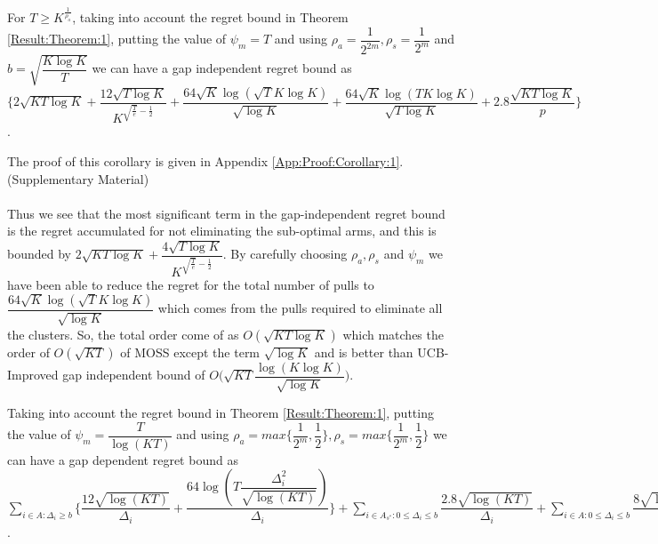 \begin{corollary}
\label{Result:Corollary:1}
For $T\geq K^{\frac{1}{\rho_{a}}}$, taking into account the regret bound in Theorem \ref{Result:Theorem:1}, putting the value of $\psi_{m}=T$ and using $\rho_{a}=\dfrac{1}{2^{2m}},\rho_{s}=\dfrac{1}{2^{m}} $ and $b=\sqrt{\dfrac{K\log K}{T}}$ we can have a gap independent regret bound as $\bigg\lbrace 2\sqrt{KT\log K} + \dfrac{12\sqrt{T\log K}}{K^{\sqrt{\frac{T}{e}}-\frac{1}{2}}} + \dfrac{64\sqrt{K}\log{(\sqrt{T}K\log K)}}{\sqrt{\log K}} + \dfrac{64\sqrt{K}\log{(TK\log K)}}{\sqrt{T\log K}} + 2.8\dfrac{\sqrt{KT\log K}}{p} \bigg\rbrace$.
\end{corollary}


	The proof of this corollary is given in Appendix \ref{App:Proof:Corollary:1}.(Supplementary Material)

\paragraph*{}Thus we see that the most significant term in the gap-independent regret bound is the regret accumulated for not eliminating the sub-optimal arms, and this is bounded by $2\sqrt{KT\log K} + \dfrac{4\sqrt{T\log K}}{K^{\sqrt{\frac{T}{e}}-\frac{1}{2}}}$. By carefully choosing $\rho_{a},\rho_{s}$ and $\psi_{m}$ we have been able to reduce the regret for the total number of pulls to $\dfrac{64\sqrt{K}\log{(\sqrt{T}K\log K)}}{\sqrt{\log K}}$ which comes from the pulls required to eliminate all the clusters. So, the total order come of as $O(\sqrt{KT\log K})$ which matches the order of $O(\sqrt{KT})$ of MOSS except the term $\sqrt{\log K}$ and is better than UCB-Improved gap independent bound of $O\big(\sqrt{KT}\dfrac{\log(K\log K)}{\sqrt{\log K}}\big)$.

\begin{corollary}
\label{Result:Corollary:2}
Taking into account the regret bound in Theorem \ref{Result:Theorem:1}, putting the value of $\psi_{m}=\dfrac{T}{\log (KT)}$ and using $\rho_{a}=max\bigg\lbrace\dfrac{1}{2^{m}},\dfrac{1}{2}\bigg\rbrace,\rho_{s}=max\bigg\lbrace\dfrac{1}{2^{m}},\dfrac{1}{2}\bigg\rbrace $ we can have a gap dependent regret bound as $ \sum_{i\in A:\Delta_{i}\geq b}\bigg\lbrace\dfrac{12\sqrt{\log (KT)}}{\Delta_{i}}  + \dfrac{64\log{(T\dfrac{\Delta_{i}^{2}}{\sqrt{\log (KT)}})}}{\Delta_{i}}\bigg\rbrace + \sum\limits_{i\in A_{s^{*}}:0\leq\Delta_{i}\leq b}\dfrac{2.8\sqrt{\log (KT)}}{\Delta_{i}} + \sum\limits_{i\in A:0\leq\Delta_{i}\leq b}\dfrac{8\sqrt{\log (KT)}}{\Delta_{i}}$.
\end{corollary}

